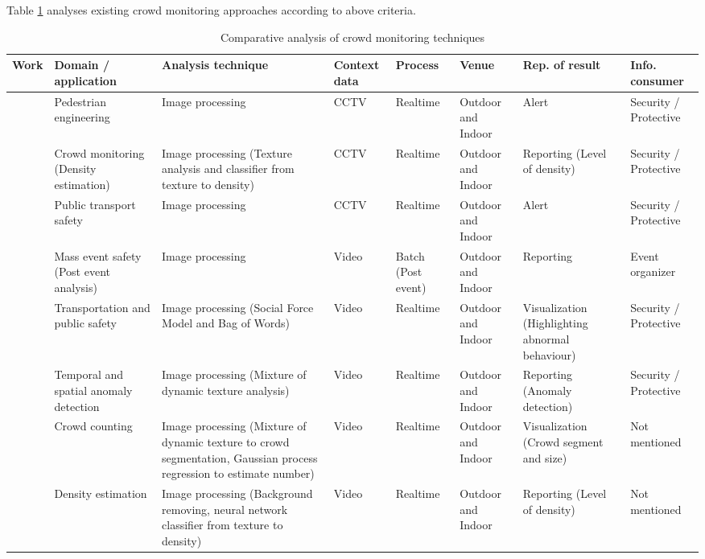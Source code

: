 Table \ref{table:crowdMonitoringTechAnalysis} analyses existing crowd monitoring approaches according to above criteria.

\begin{center}
	\begin{longtable}{|p{1.8cm}|p{2cm}|p{2cm}|p{1.8cm}|p{1.3cm}|p{1.3cm}|p{2cm}|p{1.3cm}|}
		\caption{Comparative analysis of crowd monitoring techniques}
		\label{table:crowdMonitoringTechAnalysis} \\
		\hline
		\textbf{Work} & \textbf{Domain / application} & \textbf{Analysis technique} & \textbf{Context data} & \textbf{Process} & \textbf{Venue} & \textbf{Rep. of result} & \textbf{Info. consumer} \\
		\hline \hline
		\citet{Davies1995} & Pedestrian engineering & Image processing & CCTV & Realtime & Outdoor and Indoor & Alert & Security / Protective \\
		\hline
		\citet{Marana1997} & Crowd monitoring (Density estimation) & Image processing (Texture analysis and classifier from texture to density) & CCTV & Realtime & Outdoor and Indoor & Reporting (Level of density) & Security / Protective \\
		\hline
		\citet{Velastin1999} & Public transport safety & Image processing & CCTV & Realtime & Outdoor and Indoor & Alert & Security / Protective \\
		\hline
		\citet{Johansson2008} & Mass event safety (Post event analysis) & Image processing & Video & Batch (Post event) & Outdoor and Indoor & Reporting & Event organizer \\
		\hline
		\citet{Mehran2009} & Transportation and public safety & Image processing (Social Force Model and Bag of Words) & Video & Realtime & Outdoor and Indoor & Visualization (Highlighting abnormal behaviour) & Security / Protective \\
		\hline
		\citet{Mahadevan2010} & Temporal and spatial anomaly detection & Image processing (Mixture of dynamic texture analysis) & Video & Realtime & Outdoor and Indoor & Reporting (Anomaly detection) & Security / Protective \\
		\hline
		\citet{Chan2008} & Crowd counting & Image processing (Mixture of dynamic texture to crowd segmentation, Gaussian process regression to estimate number) & Video & Realtime & Outdoor and Indoor & Visualization (Crowd segment and size) & Not mentioned \\
		\hline
		\citet{Li2010} & Density estimation & Image processing (Background removing, neural network classifier from texture to density) & Video & Realtime & Outdoor and Indoor & Reporting (Level of density) & Not mentioned \\

\end{longtable}
\end{center}
